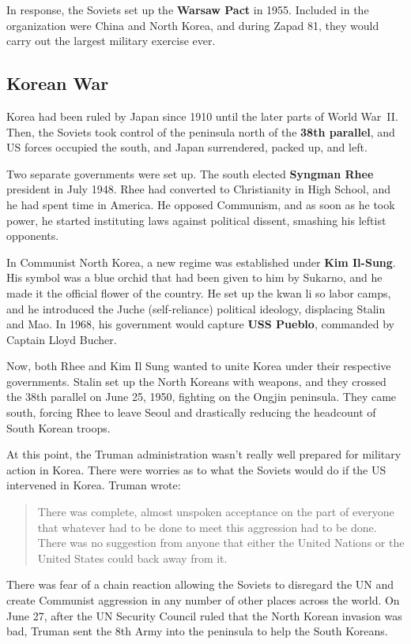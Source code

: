 In response, the Soviets set up the \textbf{Warsaw Pact} in 1955.
Included in the organization were China and North Korea,
and during Zapad 81, they would carry out the largest military exercise ever.

\subsection*{Korean War}

Korea had been ruled by Japan since 1910 until the later parts of World War~II\@.
Then, the Soviets took control of the peninsula north of the \textbf{38th parallel},
and US forces occupied the south, and Japan surrendered, packed up, and left.

Two separate governments were set up.
The south elected \textbf{Syngman Rhee} president in July 1948.
Rhee had converted to Christianity in High School, and he had spent time in America.
He opposed Communism, and as soon as he took power,
he started instituting laws against political dissent, smashing his leftist opponents.

In Communist North Korea, a new regime was established under \textbf{Kim Il-Sung}.
His symbol was a blue orchid that had been given to him by Sukarno, and he made it the official flower of the country.
He set up the kwan li so labor camps,
and he introduced the Juche (self-reliance) political ideology, displacing Stalin and Mao.
In 1968, his government would capture \textbf{USS Pueblo}, commanded by Captain Lloyd Bucher.

Now, both Rhee and Kim Il Sung wanted to unite Korea under their respective governments.
Stalin set up the North Koreans with weapons,
and they crossed the 38th parallel on June 25, 1950, fighting on the Ongjin peninsula.
They came south, forcing Rhee to leave Seoul and drastically reducing the headcount of South Korean troops.

At this point, the Truman administration wasn't really well prepared for military action in Korea.
There were worries as to what the Soviets would do if the US intervened in Korea.
Truman wrote:
\begin{quote}
  There was complete,
  almost unspoken acceptance on the part of everyone
  that whatever had to be done to meet this aggression had to be done.
  There was no suggestion from anyone that either the United Nations or the United States could back away from it.
\end{quote}
There was fear of a chain reaction allowing the Soviets to disregard the UN
and create Communist aggression in any number of other places across the world.
On June 27, after the UN Security Council ruled that the North Korean invasion was bad,
Truman sent the 8th Army into the peninsula to help the South Koreans.


